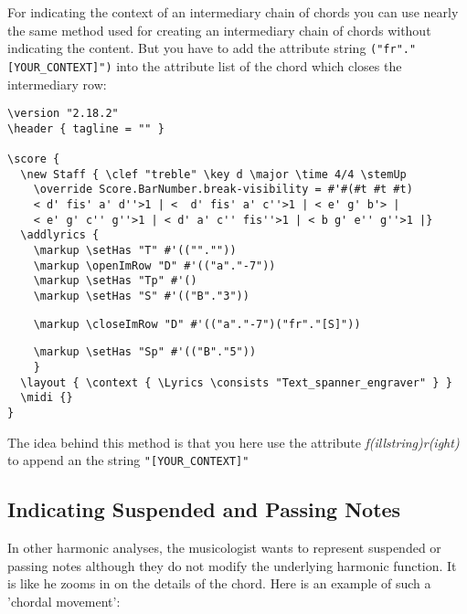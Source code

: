 \documentclass[
  DIV=calc,
  BCOR=5mm,
  12pt,
  headings=small,
  oneside,
  abstract=true,
  toc=bib,
  xcolor=dvipsnames,
  openany,
  english]{scrartcl}
\newcommand{\acc}[0]{\textit}
\begin{document}
For indicating the context of an intermediary chain of chords you can use nearly
the same method used for creating an intermediary chain of chords without
indicating the content. But you have to add the attribute string
\texttt{("fr"."[YOUR\_CONTEXT]")} into the attribute list of the chord which
closes the intermediary row:

\begin{scriptsize}
\begin{verbatim}
\version "2.18.2"
\header { tagline = "" }

\score {
  \new Staff { \clef "treble" \key d \major \time 4/4 \stemUp
    \override Score.BarNumber.break-visibility = #'#(#t #t #t)
    < d' fis' a' d''>1 | <  d' fis' a' c''>1 | < e' g' b'> |
    < e' g' c'' g''>1 | < d' a' c'' fis''>1 | < b g' e'' g''>1 |}
  \addlyrics {
    \markup \setHas "T" #'(("".""))
    \markup \openImRow "D" #'(("a"."-7"))
    \markup \setHas "Tp" #'()
    \markup \setHas "S" #'(("B"."3"))
\end{verbatim}
{ \color{red} \verb|    \markup \closeImRow "D" #'(("a"."-7")("fr"."[S]"))| }
\begin{verbatim}
    \markup \setHas "Sp" #'(("B"."5"))
    }
  \layout { \context { \Lyrics \consists "Text_spanner_engraver" } }
  \midi {}
}
\end{verbatim}
\end{scriptsize}

The idea behind this method is that you here use the attribute
\acc{f(illstring)r(ight)} to append an the string \texttt{"[YOUR\_CONTEXT]"}

\subsection{Indicating Suspended and Passing Notes}

In other harmonic analyses, the musicologist wants to represent suspended or
passing notes although they do not modify the underlying harmonic function. It
is like he zooms in on the details of the chord. Here is an example of such a
'chordal movement':
\end{document}
